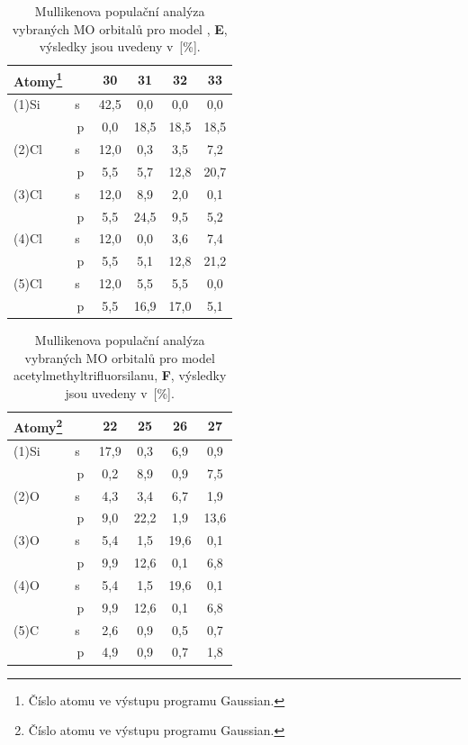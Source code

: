 \documentclass[
digital, %
table,   %
nolof,     %
nolot,     %
oneside,
]{fithesis3}
\begin{document}
\begin{table}[H] \begin{minipage}{\textwidth}
\begin{center}
\caption{Mullikenova populační analýza vybraných MO orbitalů pro model , \textbf{E}, výsledky jsou uvedeny v~[\%].}
\begin{tabular}{|l|c|c|c|c|c|}
\hline
Atomy\footnote{Číslo atomu ve výstupu programu Gaussian.} \label{MP_si_cl4} &  & 30 & 31 & 32 & 33 \\ \hline
(1)Si & s~& 42,5  & 0,0  & 0,0  & 0,0  \\ \hline
& p & 0,0  & 18,5  & 18,5  & 18,5  \\ \hline
(2)Cl & s~& 12,0  & 0,3  & 3,5  & 7,2  \\ \hline
& p & 5,5  & 5,7  & 12,8  & 20,7  \\ \hline
(3)Cl & s~& 12,0  & 8,9  & 2,0  & 0,1  \\ \hline
& p & 5,5  & 24,5  & 9,5  & 5,2  \\ \hline
(4)Cl & s~& 12,0  & 0,0  & 3,6  & 7,4  \\ \hline
& p & 5,5  & 5,1  & 12,8  & 21,2  \\ \hline
(5)Cl & s~& 12,0  & 5,5  & 5,5  & 0,0  \\ \hline
& p & 5,5  & 16,9  & 17,0  & 5,1  \\ \hline
\end{tabular}\end{center}\end{minipage}\end{table}


\begin{table}[H] \begin{minipage}{\textwidth}
\caption{Mullikenova populační analýza vybraných MO orbitalů pro model acetylmethyltrifluorsilanu, \textbf{F}, výsledky jsou uvedeny v~[\%].}
\begin{center}
\begin{tabular}{|l|c|c|c|c|c|}
\hline
Atomy\footnote{Číslo atomu ve výstupu programu Gaussian.}\label{acetylmethyltrifluorsilan_MPA}&  & 22 & 25 & 26 & 27 \\ \hline
(1)Si & s~& 17,9  & 0,3  & 6,9  & 0,9  \\ \hline
& p & 0,2  & 8,9  & 0,9  & 7,5  \\ \hline
(2)O & s~& 4,3  & 3,4  & 6,7  & 1,9  \\ \hline
& p & 9,0  & 22,2  & 1,9  & 13,6  \\ \hline
(3)O & s~& 5,4  & 1,5  & 19,6  & 0,1  \\ \hline
& p & 9,9  & 12,6  & 0,1  & 6,8  \\ \hline
(4)O & s~& 5,4  & 1,5  & 19,6  & 0,1  \\ \hline
& p & 9,9  & 12,6  & 0,1  & 6,8  \\ \hline
(5)C & s~& 2,6  & 0,9  & 0,5  & 0,7  \\ \hline
& p & 4,9  & 0,9  & 0,7  & 1,8  \\ \hline
\end{tabular}\end{center}\end{minipage}\end{table}
\end{document}
